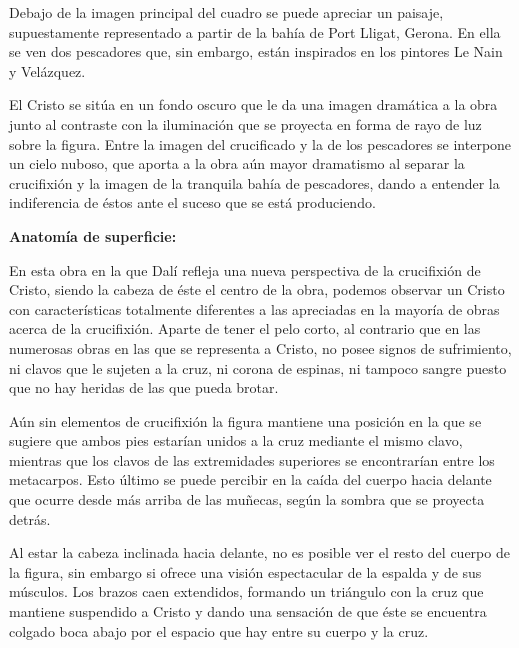 Debajo de la imagen principal del cuadro se puede apreciar un paisaje, supuestamente representado a partir de la bahía de Port Lligat, Gerona. En ella se ven dos pescadores que, sin embargo, están inspirados en los pintores Le Nain y Velázquez. %

El Cristo se sitúa en un fondo oscuro que le da una imagen dramática a la obra junto al contraste con la iluminación que se proyecta en forma de rayo de luz sobre la figura. Entre la imagen del crucificado y la de los pescadores se interpone un cielo nuboso, que aporta a la obra aún mayor dramatismo al separar la crucifixión y la imagen de la tranquila bahía de pescadores, dando a entender la indiferencia de éstos ante el suceso que se está produciendo.


\newpage
\textbf{Anatomía de superficie:}

En esta obra en la que Dalí refleja una nueva perspectiva de la crucifixión de Cristo, siendo la cabeza de éste el centro de la obra, podemos observar un Cristo con características totalmente diferentes a las apreciadas en la mayoría de obras acerca de la crucifixión. Aparte de tener el pelo corto, al contrario que en las numerosas obras en las que se representa a Cristo, no posee signos de sufrimiento, ni clavos que le sujeten a la cruz, ni corona de espinas, ni tampoco sangre puesto que no hay heridas de las que pueda brotar.

Aún sin elementos de crucifixión la figura mantiene una posición en la que se sugiere que ambos pies estarían unidos a la cruz mediante el mismo clavo, mientras que los clavos de las extremidades superiores se encontrarían entre los metacarpos. Esto último se puede percibir en la caída del cuerpo hacia delante que ocurre desde más arriba de las muñecas, según la sombra que se proyecta detrás.

Al estar la cabeza inclinada hacia delante, no es posible ver el resto del cuerpo de la figura, sin embargo si ofrece una visión espectacular de la espalda y de sus músculos. Los brazos caen extendidos, formando un triángulo con la cruz que mantiene suspendido a Cristo y dando una sensación de que éste se encuentra colgado boca abajo por el espacio que hay entre su cuerpo y la cruz.

